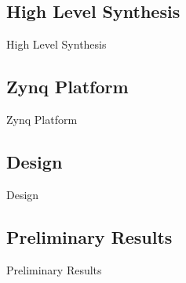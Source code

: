 \subsection{High Level Synthesis}
\begin{frame}{High Level Synthesis}
\end{frame}

\subsection{Zynq Platform}
\begin{frame}{Zynq Platform}
\end{frame}

\subsection{Design}
\begin{frame}{Design}
\end{frame}

\subsection{Preliminary Results}
\begin{frame}{Preliminary Results}
\end{frame}